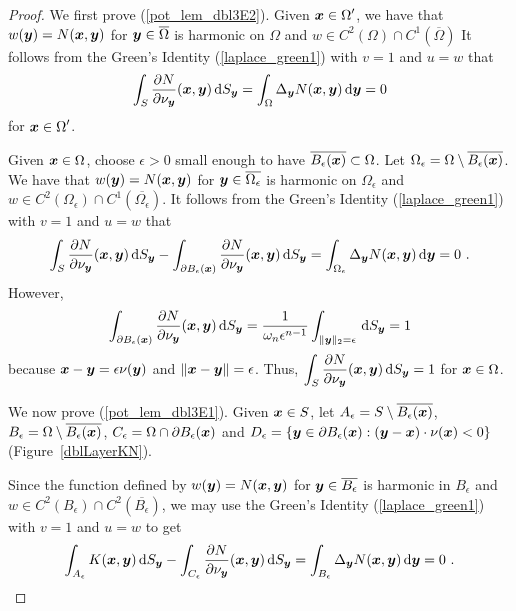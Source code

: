 \begin{proof}
 We first prove (\ref{pot_lem_dbl3E2}).
Given $\displaystyle {\bm{x}} \in \Omega^{\prime}$, we have that
$w({\bm{y}}) = N({\bm{x}},{\bm{y}})$ for ${\bm{y}} \in \overline{\Omega}$
is harmonic on $\Omega$ and
$\displaystyle w \in C^2(\Omega) \cap C^1(\overline{\Omega})$
It follows from the Green's Identity (\ref{laplace_green1}) with
$v = 1$ and $u= w$ that
\[
\int_S \frac{\partial{N}}{\partial \nu_{{\bm{y}}}}({\bm{x}},{\bm{y}}) \,\mathrm{d}{S}_{{\bm{y}}} =
\int_{\Omega} \Delta_{{\bm{y}}} N({\bm{x}},{\bm{y}}) \,\mathrm{d}{{\bm{y}}} = 0
\]
for $\displaystyle {\bm{x}} \in \Omega^{\prime}$.

Given ${\bm{x}} \in \Omega$, choose $\epsilon >0$ small enough to have
$\overline{B_\epsilon({\bm{x}})} \subset \Omega$.
Let $\displaystyle \Omega_\epsilon = \Omega \setminus
\overline{B_\epsilon({\bm{x}})}$.  We have that
$w({\bm{y}}) = N({\bm{x}},{\bm{y}})$ for ${\bm{y}} \in \overline{\Omega_\epsilon}$
is harmonic on $\Omega_\epsilon$ and
$\displaystyle w \in C^2\left(\Omega_\epsilon\right) \cap
C^1\left(\overline{\Omega_\epsilon}\right)$.
It follows from the Green's Identity (\ref{laplace_green1}) with
$v = 1$ and $u = w$ that
\[
\int_S \frac{\partial{N}}{\partial \nu_{{\bm{y}}}}({\bm{x}},{\bm{y}}) \,\mathrm{d}{S}_{{\bm{y}}}
- \int_{\partial B_\epsilon({\bm{x}})}
\frac{\partial{N}}{\partial \nu_{{\bm{y}}}}({\bm{x}},{\bm{y}}) \,\mathrm{d}{S}_{{\bm{y}}}
=
\int_{\Omega_\epsilon} \Delta_{{\bm{y}}} N({\bm{x}},{\bm{y}}) \,\mathrm{d}{{\bm{y}}} = 0 \ .
\]
However,
\[
\int_{\partial B_\epsilon({\bm{x}})}
\frac{\partial{N}}{\partial \nu_{{\bm{y}}}}({\bm{x}},{\bm{y}}) \,\mathrm{d}{S}_{{\bm{y}}}
= \frac{1}{\omega_n \epsilon^{n-1}}
\int_{\|{\bm{y}}\|_2=\epsilon} \,\mathrm{d}{S}_{{\bm{y}}} = 1
\]
because ${\bm{x}}-{\bm{y}} = \epsilon \nu({\bm{y}})$ and
$\|{\bm{x}}-{\bm{y}}\| = \epsilon$.  Thus,
$\displaystyle
\int_S \frac{\partial{N}}{\partial \nu_{{\bm{y}}}}({\bm{x}},{\bm{y}}) \,\mathrm{d}{S}_{{\bm{y}}} = 1$
for ${\bm{x}} \in \Omega$.

 We now prove (\ref{pot_lem_dbl3E1}).
Given ${\bm{x}} \in S$, let
$A_\epsilon = S \setminus \overline{B_\epsilon({\bm{x}})}$,
$B_\epsilon = \Omega \setminus \overline{B_\epsilon({\bm{x}})}$,
$C_\epsilon = \Omega \cap \partial B_\epsilon({\bm{x}})$ and
$\displaystyle D_\epsilon = \left\{{\bm{y}} \in \partial B_\epsilon({\bm{x}}) :
  ({\bm{y}}- {\bm{x}})\cdot \nu({\bm{x}}) < 0 \right\}$
(Figure~\ref{dblLayerKN}).

Since the function defined by $w({\bm{y}}) = N({\bm{x}},{\bm{y}})$ for
${\bm{y}} \in \overline{B_\epsilon}$ is
harmonic in $B_\epsilon$ and
$\displaystyle w \in C^2(B_\epsilon)\cap C^2\left(\overline{B_\epsilon}\right)$,
we may use the Green's Identity (\ref{laplace_green1}) with
$v = 1$ and $u = w$ to get
\[
\int_{A_\epsilon} K({\bm{x}},{\bm{y}}) \,\mathrm{d}{S}_{{\bm{y}}}
-\int_{C_\epsilon} \frac{\partial{N}}{\partial \nu_{\bm{y}}}({\bm{x}},{\bm{y}}) \,\mathrm{d}{S}_{{\bm{y}}}
= \int_{B_\epsilon} \Delta_{{\bm{y}}} N({\bm{x}},{\bm{y}}) \,\mathrm{d}{{\bm{y}}} = 0 \ .
\]


\end{proof}
